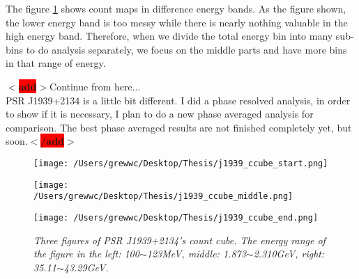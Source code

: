\documentclass[12pt]{report}
\newcommand{\mycaption}[1]{\caption{\textit{\footnotesize #1}}}
\newcommand{\add}[1]{
  $<$\colorbox{red}{\textbf{add}}$>$#1$<$\colorbox{red}{\textbf{/add}}$>$
}
\begin{document}
          The figure \ref{fig: j1939_count_cube} shows count maps in difference energy bands. As 
          the figure shown, the lower energy band is too messy while there is nearly nothing 
          valuable in the high energy band. Therefore, when we divide the total energy bin into 
          many sub-bins to do analysis separately, we focus on the middle parts and have more bins
          in that range of energy.

          \add{Continue from here... \\
            PSR J1939+2134 is a little bit different. I did a phase resolved analysis, 
            in order to show if it is necessary, I plan to do a new phase averaged analysis for 
            comparison. The best phase averaged results are not finished completely yet, but soon.}
          \begin{figure}[!ht]
            \begin{minipage}{0.32\textwidth}
              \begin{center} 
                \texttt{[image: /Users/grewwc/Desktop/Thesis/j1939\_ccube\_start.png]}
              \end{center}
            \end{minipage}
            \begin{minipage}{0.32\textwidth}
              \begin{center}
                \texttt{[image: /Users/grewwc/Desktop/Thesis/j1939\_ccube\_middle.png]}
              \end{center}
            \end{minipage}
            \begin{minipage}{0.32\textwidth}
              \begin{center}
              \texttt{[image: /Users/grewwc/Desktop/Thesis/j1939\_ccube\_end.png]}
              \end{center}
            \end{minipage}
            \centering
            \begin{minipage}{0.8\textwidth}
              \mycaption{Three figures of PSR J1939+2134's count cube. The energy range of the figure in the 
                left: 100$\sim$123MeV, middle: 1.873$\sim$2.310GeV, right: 35.11$\sim$43.29GeV.}
              \label{fig: j1939_count_cube}
            \end{minipage}
          \end{figure}
          \vspace{0.5cm}
\end{document}
